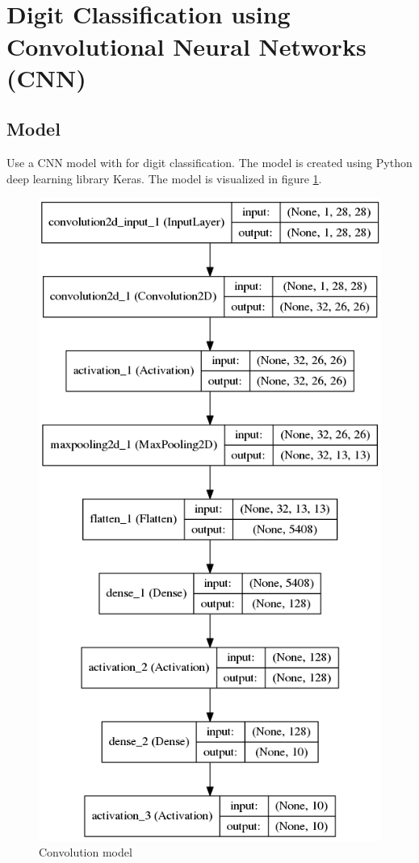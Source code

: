 \documentclass[paper=a4, fontsize=11pt]{scrartcl} %
\title{\hmwkClass \\
       \hmwkTitle}
\author{\hmwkAuthorFullName}
\date{\hmwkDueDate}
\begin{document}
    \maketitle
    \thispagestyle{fancy} %

\section{Digit Classification using Convolutional Neural Networks (CNN)}
    \subsection*{Model}
    Use a CNN model with for digit classification. The model is created using Python deep learning library Keras. The model is visualized in figure \ref{fig:model}.
    \begin{figure}[H]
        \begin{center}
            \includegraphics[width=0.6\linewidth]{images/mnist_model.png}
            \caption{Convolution model}
            \label{fig:model}
        \end{center}
    \end{figure}
\end{document}
